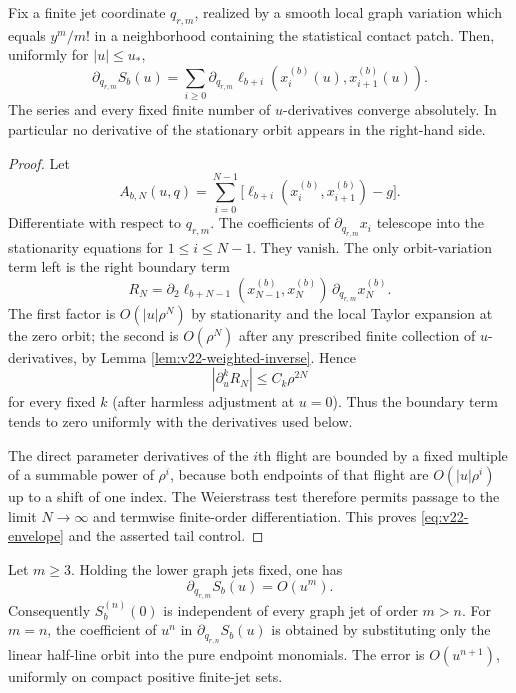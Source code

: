 \begin{lemma}
\label{lem:v22-envelope}
Fix a finite jet coordinate $q_{r,m}$, realized by a smooth local graph
variation which equals $y^m/m!$ in a neighborhood containing the statistical
contact patch.  Then, uniformly for $|u|\le u_*$,
\begin{equation}\label{eq:v22-envelope}
 \partial_{q_{r,m}}S_b(u)
 =\sum_{i\ge0}\partial_{q_{r,m}}\ell_{b+i}
       (x_i^{(b)}(u),x_{i+1}^{(b)}(u)).
\end{equation}
The series and every fixed finite number of $u$-derivatives converge
absolutely.  In particular no derivative of the stationary orbit appears in
the right-hand side.
\end{lemma}

\begin{proof}
Let
\[
 A_{b,N}(u,q)=\sum_{i=0}^{N-1}
 \bigl[\ell_{b+i}(x_i^{(b)},x_{i+1}^{(b)})-g\bigr].
\]
Differentiate with respect to $q_{r,m}$.  The coefficients of
$\partial_{q_{r,m}}x_i$ telescope into the stationarity equations for
$1\le i\le N-1$.  They vanish.  The only orbit-variation term left is the
right boundary term
\[
 R_N=\partial_2\ell_{b+N-1}(x_{N-1}^{(b)},x_N^{(b)})
             \,\partial_{q_{r,m}}x_N^{(b)}.
\]
The first factor is $O(|u|\rho^N)$ by stationarity and the local Taylor
expansion at the zero orbit; the second is $O(\rho^N)$ after any prescribed
finite collection of $u$-derivatives, by Lemma
\ref{lem:v22-weighted-inverse}.  Hence
\begin{equation}\label{eq:v22-tail-bound}
                |\partial_u^kR_N|\le C_k\rho^{2N}
\end{equation}
for every fixed $k$ (after harmless adjustment at $u=0$).  Thus the boundary
term tends to zero uniformly with the derivatives used below.

The direct parameter derivatives of the $i$th flight are bounded by a fixed
multiple of a summable power of $\rho^i$, because both endpoints of that
flight are $O(|u|\rho^i)$ up to a shift of one index.  The Weierstrass test
therefore permits passage to the limit $N\to\infty$ and termwise finite-order
differentiation.  This proves \eqref{eq:v22-envelope} and the asserted tail
control.
\end{proof}

\begin{lemma}
\label{lem:v22-homogeneous-isolation}
Let $m\ge3$.  Holding the lower graph jets fixed, one has
\begin{equation}\label{eq:v22-variation-order}
              \partial_{q_{r,m}}S_b(u)=O(u^m).
\end{equation}
Consequently $S_b^{(n)}(0)$ is independent of every graph jet of order
$m>n$.  For $m=n$, the coefficient of $u^n$ in
$\partial_{q_{r,n}}S_b(u)$ is obtained by substituting only the linear
half-line orbit into the pure endpoint monomials.  The error is
$O(u^{n+1})$, uniformly on compact positive finite-jet sets.
\end{lemma}

